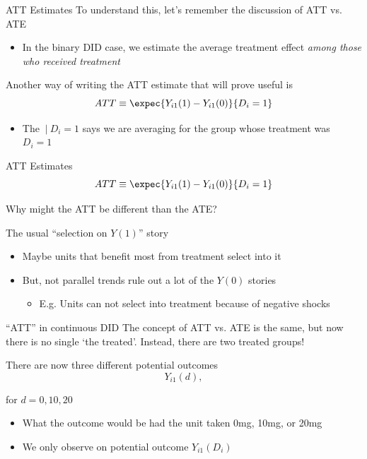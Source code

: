 \documentclass[aspectratio=169,t]{beamer}
\begin{document}
\begin{frame}{ATT Estimates}
  To understand this, let's remember the discussion of ATT vs. ATE

  \begin{itemize}
    \item In the binary DID case, we estimate the average treatment effect \emph{among those who received treatment}
  \end{itemize}

  \bigskip
  Another way of writing the ATT estimate that will prove useful is
  $$
    ATT \equiv \expec{Y_{i1}(1) - Y_{i1}(0)}{D_i = 1}
  $$

  \begin{itemize}
    \item The $\ |\ D_i = 1$ says we are averaging for the group whose treatment was $D_i = 1$
  \end{itemize}
\end{frame}

\begin{frame}{ATT Estimates}
  \vspace{-\bigskipamount}
  $$
    ATT \equiv \expec{Y_{i1}(1) - Y_{i1}(0)}{D_i = 1}
  $$

  \bigskip
  Why might the ATT be different than the ATE?

  \pause
  \bigskip
  The usual ``selection on $Y(1)$'' story
  \begin{itemize}
    \item Maybe units that benefit most from treatment select into it

    \pause
    \item But, not parallel trends rule out a lot of the $Y(0)$ stories
    \begin{itemize}
      \item E.g. Units can not select into treatment because of negative shocks
    \end{itemize}
  \end{itemize}
\end{frame}



\begin{frame}{``ATT'' in continuous DID}
  The concept of ATT vs. ATE is the same, but now there is no single `the treated'. Instead, there are two treated groups!

  There are now three different potential outcomes
  $$
    Y_{i1}(d),
  $$

  for $d = 0, 10, 20$
  \begin{itemize}
    \item What the outcome would be had the unit taken 0mg, 10mg, or 20mg

    \item We only observe on potential outcome $Y_{i1}(D_i)$
  \end{itemize}
\end{frame}
\end{document}
